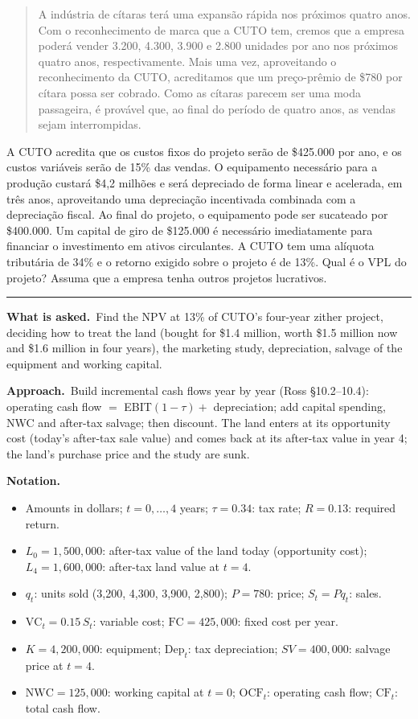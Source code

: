 \documentclass[11pt,a4paper]{article}
\numberwithin{equation}{section}
\newenvironment{notation}{\par\noindent\textbf{Notation.}\begin{itemize}[leftmargin=1.4em]}{\end{itemize}}
\newcommand{\asked}{\par\medskip\noindent\textbf{What is asked.}~}
\newcommand{\approach}{\par\smallskip\noindent\textbf{Approach.}~}
\newcommand{\stmtend}{\par\endgroup\nopagebreak\noindent\rule{\linewidth}{0.4pt}\par\medskip}
\begin{document}
\begin{quote}
A indústria de cítaras terá uma expansão rápida nos próximos quatro anos. Com o reconhecimento de
marca que a CUTO tem, cremos que a empresa poderá vender 3.200, 4.300, 3.900 e 2.800 unidades por
ano nos próximos quatro anos, respectivamente. Mais uma vez, aproveitando o reconhecimento da CUTO,
acreditamos que um preço-prêmio de \$780 por cítara possa ser cobrado. Como as cítaras parecem ser
uma moda passageira, é provável que, ao final do período de quatro anos, as vendas sejam
interrompidas.
\end{quote}

A CUTO acredita que os custos fixos do projeto serão de \$425.000 por ano, e os custos variáveis
serão de 15\% das vendas. O equipamento necessário para a produção custará \$4,2 milhões e será
depreciado de forma linear e acelerada, em três anos, aproveitando uma depreciação incentivada
combinada com a depreciação fiscal. Ao final do projeto, o equipamento pode ser sucateado por
\$400.000. Um capital de giro de \$125.000 é necessário imediatamente para financiar o investimento
em ativos circulantes. A CUTO tem uma alíquota tributária de 34\% e o retorno exigido sobre o
projeto é de 13\%. Qual é o VPL do projeto? Assuma que a empresa tenha outros projetos lucrativos.
\stmtend

\asked Find the NPV at 13\% of CUTO's four-year zither project, deciding how to treat the land
(bought for \$1.4 million, worth \$1.5 million now and \$1.6 million in four years), the
marketing study, depreciation, salvage of the equipment and working capital.

\approach Build incremental cash flows year by year (Ross \S10.2--10.4): operating cash flow
$=$ EBIT$(1-\tau)+$ depreciation; add capital spending, NWC and after-tax salvage; then
discount. The land enters at its opportunity cost (today's after-tax sale value) and comes back
at its after-tax value in year 4; the land's purchase price and the study are sunk.

\begin{notation}
  \item Amounts in dollars; $t=0,\dots,4$ years; $\tau=0.34$: tax rate; $R=0.13$: required return.
  \item $L_0=1{,}500{,}000$: after-tax value of the land today (opportunity cost); $L_4=1{,}600{,}000$: after-tax land value at $t=4$.
  \item $q_t$: units sold (3{,}200, 4{,}300, 3{,}900, 2{,}800); $P=780$: price; $S_t=Pq_t$: sales.
  \item $\mathrm{VC}_t=0.15\,S_t$: variable cost; $\mathrm{FC}=425{,}000$: fixed cost per year.
  \item $K=4{,}200{,}000$: equipment; $\mathrm{Dep}_t$: tax depreciation; $SV=400{,}000$: salvage price at $t=4$.
  \item $\mathrm{NWC}=125{,}000$: working capital at $t=0$; $\mathrm{OCF}_t$: operating cash flow; $\mathrm{CF}_t$: total cash flow.
\end{notation}
\end{document}

